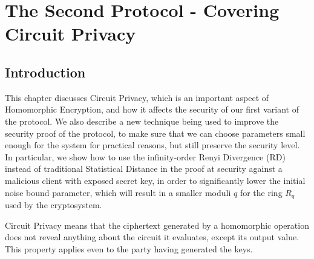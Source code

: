 \chapter{The Second Protocol - Covering Circuit Privacy}
\label{chap:renyiDivergence}

\ifpdf
    \graphicspath{{Chapter4/Figs/Raster/}{Chapter4/Figs/PDF/}{Chapter4/Figs/}}
\else
    \graphicspath{{Chapter4/Figs/Vector/}{Chapter4/Figs/}}
\fi

\section{Introduction}
\label{sec:secProcIntro}
This chapter discusses Circuit Privacy, which is an important aspect of
Homomorphic Encryption, and how it affects the security of our first variant
of the protocol. We also describe a new technique being used to improve the
security proof of the protocol, to make sure that we can choose parameters small
enough for the system for practical reasons, but still preserve the security level. In
particular, we show how to use the infinity-order Renyi Divergence (RD) instead of
traditional Statistical Distance in the proof at security against a malicious client with exposed secret key, in order to significantly lower the initial noise bound parameter, which will result in a smaller moduli \(q\) for the ring \(R_{q}\) used by the
cryptosystem.

Circuit Privacy means that the ciphertext generated by a homomorphic operation
does not reveal anything about the circuit it evaluates, except its output
value. This property applies even to the party having generated the
keys.

